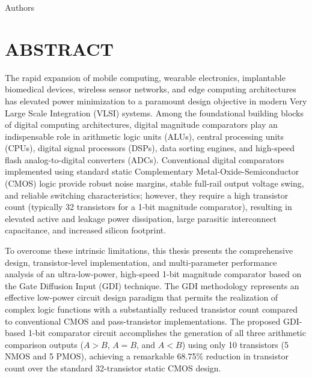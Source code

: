 \documentclass[12pt,a4paper,oneside]{report}
\begin{document}
\vspace{1.5cm}
\noindent Authors

\clearpage

\chapter*{ABSTRACT}

\noindent The rapid expansion of mobile computing, wearable electronics, implantable biomedical devices, wireless sensor networks, and edge computing architectures has elevated power minimization to a paramount design objective in modern Very Large Scale Integration (VLSI) systems. Among the foundational building blocks of digital computing architectures, digital magnitude comparators play an indispensable role in arithmetic logic units (ALUs), central processing units (CPUs), digital signal processors (DSPs), data sorting engines, and high-speed flash analog-to-digital converters (ADCs). Conventional digital comparators implemented using standard static Complementary Metal-Oxide-Semiconductor (CMOS) logic provide robust noise margins, stable full-rail output voltage swing, and reliable switching characteristics; however, they require a high transistor count (typically 32 transistors for a 1-bit magnitude comparator), resulting in elevated active and leakage power dissipation, large parasitic interconnect capacitance, and increased silicon footprint.

\noindent To overcome these intrinsic limitations, this thesis presents the comprehensive design, transistor-level implementation, and multi-parameter performance analysis of an ultra-low-power, high-speed 1-bit magnitude comparator based on the Gate Diffusion Input (GDI) technique. The GDI methodology represents an effective low-power circuit design paradigm that permits the realization of complex logic functions with a substantially reduced transistor count compared to conventional CMOS and pass-transistor implementations. The proposed GDI-based 1-bit comparator circuit accomplishes the generation of all three arithmetic comparison outputs ($A>B$, $A=B$, and $A<B$) using only 10 transistors (5 NMOS and 5 PMOS), achieving a remarkable 68.75\% reduction in transistor count over the standard 32-transistor static CMOS design.
\end{document}
